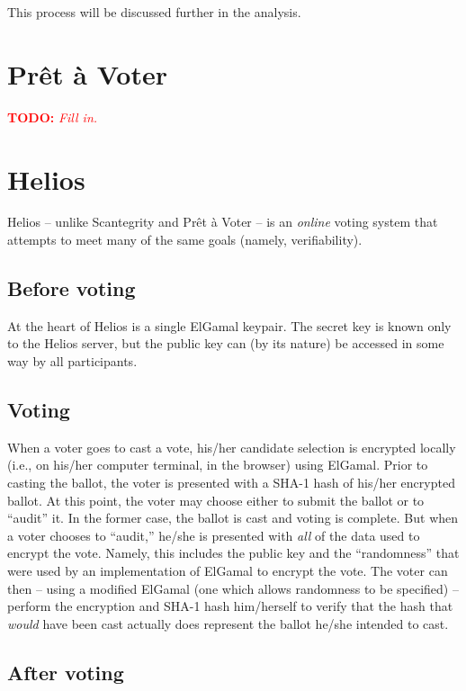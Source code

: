 \documentclass[10pt]{article}
\newcommand{\todo}[1]{\textcolor{red}{\textbf{TODO:} \emph{#1}}}
\begin{document}
\begin{multicols}{2}
This process will be discussed further in the analysis.


\section{Pr\^{e}t \`{a} Voter}

\todo{Fill in.}

\section{Helios}

Helios \cite{helios} -- unlike Scantegrity and Pr\^{e}t \`{a} Voter -- is an \emph{online} voting
system that attempts to meet many of the same goals (namely, verifiability).

\subsection{Before voting}

At the heart of Helios is a single ElGamal keypair. The secret key is known only to the Helios
server, but the public key can (by its nature) be accessed in some way by all participants.

\subsection{Voting}

When a voter goes to cast a vote, his/her candidate selection is encrypted locally (i.e., on his/her
computer terminal, in the browser) using ElGamal. Prior to casting the ballot, the voter is
presented with a SHA-1 hash of his/her encrypted ballot. At this point, the voter may choose either
to submit the ballot or to ``audit'' it. In the former case, the ballot is cast and voting is
complete. But when a voter chooses to ``audit,'' he/she is presented with \emph{all} of the data
used to encrypt the vote. Namely, this includes the public key and the ``randomness'' that were used
by an implementation of ElGamal to encrypt the vote. The voter can then -- using a modified ElGamal
(one which allows randomness to be specified) -- perform the encryption and SHA-1 hash him/herself
to verify that the hash that \emph{would} have been cast actually does represent the ballot he/she
intended to cast.

\subsection{After voting}


\end{multicols}
\end{document}
